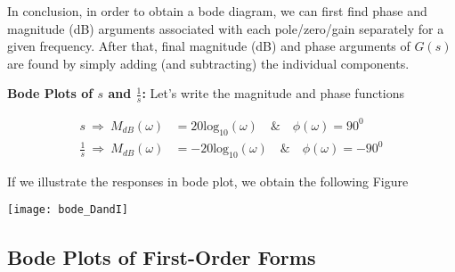 \documentclass[twoside]{article}
\begin{document}
In conclusion, in order to obtain a bode diagram, we can 
first find phase and magnitude (dB) arguments associated 
with each pole/zero/gain separately for a given frequency.
After that, final magnitude (dB) and phase arguments of $G(s)$
are found by simply adding (and subtracting) the individual components.

\newpage

\textbf{Bode Plots of $s$ and $\frac{1}{s}$:} Let's write the
magnitude and phase functions 

\begin{align*}
s \ \Rightarrow \  M_{dB}(\omega) &= 20 \mathrm{log}_{10} ( \omega ) \quad \& \quad \phi (\omega) = 90^0 
                                                        \\
\frac{1}{s} \ \Rightarrow \ M_{dB} ( \omega ) &= - 20 \mathrm{log}_{10} ( \omega ) \quad \& \quad \phi (\omega) = -90^0 
\end{align*}

If we illustrate the responses in bode plot, we obtain the following Figure

\vspace{6 pt}

  \begin{minipage}[h]{1\linewidth}
    \begin{center}
      \texttt{[image: bode\_DandI]}
    \end{center}
  \end{minipage}

\vspace{6pt}

\subsection*{Bode Plots of First-Order Forms}
\end{document}
